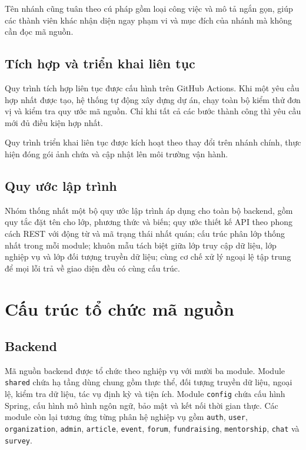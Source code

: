 \documentclass[12pt,a4paper,oneside]{report}
\begin{document}
Tên nhánh cũng tuân theo cú pháp gồm loại công việc và mô tả ngắn gọn, giúp các thành viên khác nhận diện ngay phạm vi và mục đích của nhánh mà không cần đọc mã nguồn.

\subsection{Tích hợp và triển khai liên tục}

Quy trình tích hợp liên tục được cấu hình trên GitHub Actions. Khi một yêu cầu hợp nhất được tạo, hệ thống tự động xây dựng dự án, chạy toàn bộ kiểm thử đơn vị và kiểm tra quy ước mã nguồn. Chỉ khi tất cả các bước thành công thì yêu cầu mới đủ điều kiện hợp nhất.

Quy trình triển khai liên tục được kích hoạt theo thay đổi trên nhánh chính, thực hiện đóng gói ảnh chứa và cập nhật lên môi trường vận hành.

\subsection{Quy ước lập trình}

Nhóm thống nhất một bộ quy ước lập trình áp dụng cho toàn bộ backend, gồm quy tắc đặt tên cho lớp, phương thức và biến; quy ước thiết kế API theo phong cách REST với động từ và mã trạng thái nhất quán; cấu trúc phân lớp thống nhất trong mỗi module; khuôn mẫu tách biệt giữa lớp truy cập dữ liệu, lớp nghiệp vụ và lớp đối tượng truyền dữ liệu; cùng cơ chế xử lý ngoại lệ tập trung để mọi lỗi trả về giao diện đều có cùng cấu trúc.

\section{Cấu trúc tổ chức mã nguồn}

\subsection{Backend}

Mã nguồn backend được tổ chức theo nghiệp vụ với mười ba module. Module \texttt{shared} chứa hạ tầng dùng chung gồm thực thể, đối tượng truyền dữ liệu, ngoại lệ, kiểm tra dữ liệu, tác vụ định kỳ và tiện ích. Module \texttt{config} chứa cấu hình Spring, cấu hình mô hình ngôn ngữ, bảo mật và kết nối thời gian thực. Các module còn lại tương ứng từng phân hệ nghiệp vụ gồm \texttt{auth}, \texttt{user}, \texttt{organization}, \texttt{admin}, \texttt{article}, \texttt{event}, \texttt{forum}, \texttt{fundraising}, \texttt{mentorship}, \texttt{chat} và \texttt{survey}.
\end{document}
